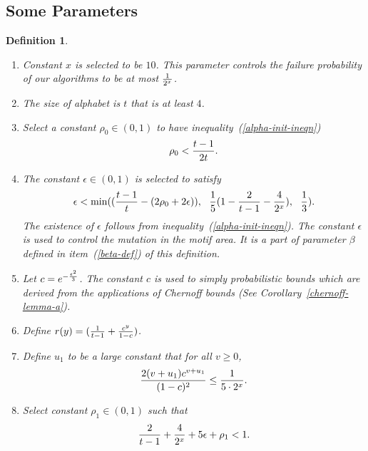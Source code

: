 \documentclass[11pt]{article}
\newtheorem{dfntn}[theoremfoo]{Definition}
\newenvironment{definition}{\pagebreak[1]\begin{dfntn}\rm}{\end{dfntn}}
\newcommand{\scrod}{\quad\nopagebreak}
\begin{document}
\subsection{Some Parameters}
\begin{definition}\label{param-def}\scrod
\begin{enumerate}
\item
Constant $x$ is selected to be $10$. This parameter controls the
failure probability of our algorithms to be at most ${1\over 2^x}$.
\item
The size of alphabet is $t$ that is at least $4$.
\item
Select a constant $\rho_0\in (0,1)$ to have
inequality~(\ref{alpha-init-ineqn})
\begin{eqnarray}
\rho_0<{t-1\over 2t}.\label{alpha-init-ineqn}
\end{eqnarray}
\item The constant $\epsilon\in (0,1)$ is selected to satisfy
\begin{eqnarray}
\epsilon< \min(({t-1\over t}-(2\rho_0+2\epsilon)),\  \ {1\over
5}(1-{2\over t-1}-{4\over 2^x}),\ \  {1\over
3}).\label{epsilon-set-ineqn}
\end{eqnarray}
The existence of $\epsilon$ follows from
inequality~(\ref{alpha-init-ineqn}). The constant $\epsilon$ is used
to control the mutation in the motif area. It is a part of parameter
$\beta$ defined in item~(\ref{beta-def}) of this definition.

\item
Let $c=e^{-{\epsilon^2\over 3}}$. The constant $c$ is used to simply
probabilistic bounds which are derived from the applications of
Chernoff bounds (See Corollary~\ref{chernoff-lemma-a}).

\item
Define $r(y)=({1\over t-1}+{c^y\over 1-c})$.

\item
 Define $u_1$ to be a large constant that for all $v\ge 0$,
\begin{eqnarray}
{2(v+u_1)c^{v+u_1}\over (1-c)^2}\le {1\over 5\cdot
2^x}.\label{v-set-ineqn2}
\end{eqnarray}



\item Select constant $\rho_1\in (0,1)$ such that
\begin{eqnarray}
{2\over t-1}+{4\over 2^x}+5\epsilon+\rho_1<1.\label{rho1-ineqn}
\end{eqnarray}


\end{enumerate}
\end{definition}
\end{document}
